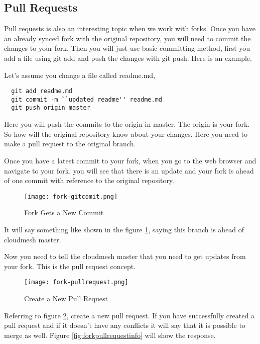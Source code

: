 \subsection{Pull Requests}

Pull requests is also an interesting topic when we work with
forks. Once you have an already synced fork with the original
repository, you will need to commit the changes to your fork. Then you
will just use basic committing method, first you add a file using git
add and push the changes with git push. Here is an example.

Let's assume you change a file called readme.md,

\begin{lstlisting}
  git add readme.md
  git commit -m ``updated readme'' readme.md
  git push origin master
\end{lstlisting}

Here you will push the commits to the origin in master. The origin is
your fork. So how will the original repository know about your changes.
Here you need to make a pull request to the original branch. 

Once you have a latest commit to your fork, when you go to the web
browser and navigate to your fork, you will see that there is an
update and your fork is ahead of one commit with reference to the
original repository.

\begin{figure}[htb]\label{fig:forkcommit}
\centering
\texttt{[image: fork-gitcomit.png]}
\caption{Fork Gets a New Commit
}
\end{figure}

It will say something like shown in the figure \ref{fig:forkcommit},
saying this branch is ahead of cloudmesh master.

Now you need to tell the cloudmesh master that you need to get updates
from your fork. This is the pull request concept.


\begin{figure}[htb]\label{fig:forkpullrequest}
\centering
\texttt{[image: fork-pullrequest.png]}
\caption{Create a New Pull Request
}
\end{figure}

Referring to figure \ref{fig:forkpullrequest}, create a new pull
request. If you have successfully created a pull request and if it
doesn't have any conflicts it will say that it is possible to merge as
well.  Figure \ref{fig:forkpullrequestinfo} will show the response.


